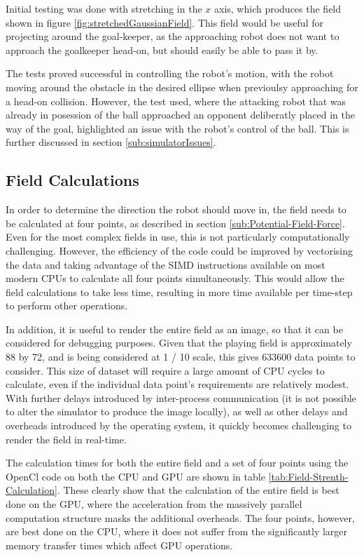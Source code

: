 \documentclass[10pt]{article}
\begin{document}
Initial testing was done with stretching in the $x$ axis, which produces the
field shown in figure \ref{fig:stretchedGaussianField}.  This field would be
useful for projecting around the goal-keeper, as the approaching robot does not
want to approach the goalkeeper head-on, but should easily be able to pass it
by.

The tests proved successful in controlling the robot's motion, with the robot
moving around the obstacle in the desired ellipse when previoulsy approaching
for a head-on collision.  However, the test used, where the attacking robot that
was already in posession of the ball approached an opponent deliberatly placed
in the way of the goal, highlighted an issue with the robot's control of the
ball.  This is further discussed in section \ref{sub:simulatorIssues}.

\subsection{Field Calculations}

In order to determine the direction the robot should move in, the field needs to
be calculated at four points, as described in section
\ref{sub:Potential-Field-Force}. Even for the most complex fields in use, this
is not particularly computationally challenging. However, the efficiency of the
code could be improved by vectorising the data and taking advantage of the
\ac{SIMD} instructions available on most modern \acp{CPU} to calculate all four
points simultaneously. This would allow the field calculations to take less
time, resulting in more time available per time-step to perform other
operations.

In addition, it is useful to render the entire field as an image, so that it can
be considered for debugging purposes. Given that the playing field is
approximately \SI{88}{\inch} by \SI{72}{\inch}, and is being considered at
\SI[quotient-mode = fraction]{1 / 10}{\inch} scale, this gives \num{633600} data
points to consider. This size of dataset will require a large amount of \ac{CPU}
cycles to calculate, even if the individual data point's requirements are
relatively modest. With further delays introduced by inter-process communication
(it is not possible to alter the simulator to produce the image locally), as
well as other delays and overheads introduced by the operating system, it
quickly becomes challenging to render the field in real-time.

The calculation times for both the entire field and a set of four points using
the OpenCl code on both the \ac{CPU} and \ac{GPU} are shown in table
\ref{tab:Field-Strenth-Calculation}. These clearly show that the calculation of
the entire field is best done on the GPU, where the acceleration from the
massively parallel computation structure masks the additional overheads. The
four points, however, are best done on the \ac{CPU}, where it does not suffer
from the significantly larger memory transfer times which affect \ac{GPU}
operations.
\end{document}
